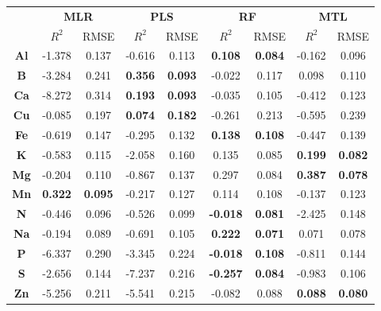\documentclass{article}
\begin{document}
\begin{table}[h!]
\begin{minipage}[t]{0.49\textwidth}
\begin{tabular}{|c|c|c|c|c|c|c|c|c|}
\hline
 & \multicolumn{2}{c|}{\textbf{MLR}} & \multicolumn{2}{c|}{\textbf{PLS}} & \multicolumn{2}{c|}{\textbf{RF}} & \multicolumn{2}{c|}{\textbf{MTL}} \\
\cline{2-9}
 & $R^2$ & RMSE & $R^2$ & RMSE & $R^2$ & RMSE & $R^2$ & RMSE \\
\hline
\textbf{Al} & -1.378 & 0.137 & -0.616 & 0.113 & {\color{blue}\textbf{0.108}} & {\color{blue}\textbf{0.084}} & -0.162 & 0.096 \\
\textbf{B}  & -3.284 & 0.241 & {\color{blue}\textbf{0.356}} & {\color{blue}\textbf{0.093}} & -0.022 & 0.117 & 0.098  & 0.110 \\
\textbf{Ca} & -8.272 & 0.314 & {\color{blue}\textbf{0.193}} & {\color{blue}\textbf{0.093}} & -0.035 & 0.105 & -0.412 & 0.123 \\
\textbf{Cu} & -0.085 & 0.197 & {\color{blue}\textbf{0.074}} & {\color{blue}\textbf{0.182}} & -0.261 & 0.213 & -0.595 & 0.239 \\
\textbf{Fe} & -0.619 & 0.147 & -0.295 & 0.132 & {\color{blue}\textbf{0.138}} & {\color{blue}\textbf{0.108}} & -0.447 & 0.139 \\
\textbf{K}  & -0.583 & 0.115 & -2.058 & 0.160 & 0.135 & 0.085 & {\color{blue}\textbf{0.199}} & {\color{blue}\textbf{0.082}} \\
\textbf{Mg} & -0.204 & 0.110 & -0.867 & 0.137 & 0.297 & 0.084 & {\color{blue}\textbf{0.387}} & {\color{blue}\textbf{0.078}} \\
\textbf{Mn} & {\color{blue}\textbf{0.322}} & {\color{blue}\textbf{0.095}} & -0.217 & 0.127 & 0.114 & 0.108 & -0.137 & 0.123 \\
\textbf{N}  & -0.446 & 0.096 & -0.526 & 0.099 & {\color{blue}\textbf{-0.018}} & {\color{blue}\textbf{0.081}} & -2.425 & 0.148 \\
\textbf{Na} & -0.194 & 0.089 & -0.691 & 0.105 & {\color{blue}\textbf{0.222}} & {\color{blue}\textbf{0.071}} & 0.071  & 0.078 \\
\textbf{P}  & -6.337 & 0.290 & -3.345 & 0.224 & {\color{blue}\textbf{-0.018}} & {\color{blue}\textbf{0.108}} & -0.811 & 0.144 \\
\textbf{S}  & -2.656 & 0.144 & -7.237 & 0.216 & {\color{blue}\textbf{-0.257}} & {\color{blue}\textbf{0.084}} & -0.983 & 0.106 \\
\textbf{Zn} & -5.256 & 0.211 & -5.541 & 0.215 & -0.082 & 0.088 & {\color{blue}\textbf{0.088}}  & {\color{blue}\textbf{0.080}} \\
\hline
\end{tabular}
\end{minipage}
\end{table}
\end{document}
